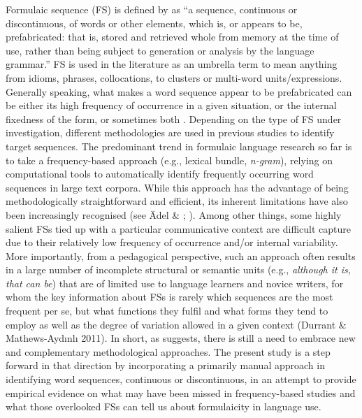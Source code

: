 \documentclass[output=paper]{langsci/langscibook}
\begin{document}
Formulaic sequence (FS) is defined by \citet[9]{Wray2002} as “a sequence, continuous or discontinuous, of words or other elements, which is, or appears to be, prefabricated: that is, stored and retrieved whole from memory at the time of use, rather than being subject to generation or analysis by the language grammar.” FS is used in the literature as an umbrella term to mean anything from idioms, phrases, collocations, to clusters or multi-word units/expressions. Generally speaking, what makes a word sequence appear to be prefabricated can be either its high frequency of occurrence in a given situation, or the internal fixedness of the form, or sometimes both \citep{Siyanova-Chanturia2013}. Depending on the type of FS under investigation, different methodologies are used in previous studies to identify target sequences. The predominant trend in formulaic language research so far is to take a frequency-based approach (e.g., lexical bundle, \textit{n-gram}), relying on computational tools to automatically identify frequently occurring word sequences in large text corpora. While this approach has the advantage of being methodologically straightforward and efficient, its inherent limitations have also been increasingly recognised (see Ädel \& \citealt{Erman2012}; \citealt{Wang2018}). Among other things, some highly salient FSs tied up with a particular communicative context are difficult capture due to their relatively low frequency of occurrence and/or internal variability. More importantly, from a pedagogical perspective, such an approach often results in a large number of incomplete structural or semantic units (e.g., \textit{although it is, that can be}) that are of limited use to language learners and novice writers, for whom the key information about FSs is rarely which sequences are the most frequent per se, but what functions they fulfil and what forms they tend to employ as well as the degree of variation allowed in a given context (Durrant \& Mathews-Aydınlı 2011). In short, as \citet{Biber2009} suggests, there is still a need to embrace new and complementary methodological approaches. The present study is a step forward in that direction by incorporating a primarily manual approach in identifying word sequences, continuous or discontinuous, in an attempt to provide empirical evidence on what may have been missed in frequency-based studies and what those overlooked FSs can tell us about formulaicity in language use. 
\end{document}
